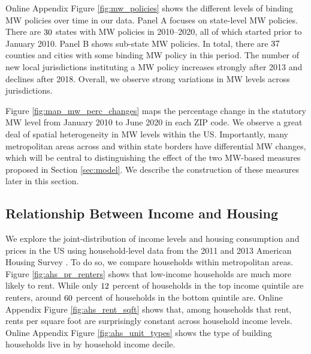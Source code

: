 Online Appendix Figure \ref{fig:mw_policies} shows the different levels of 
binding MW policies over time in our data.
Panel A focuses on state-level MW policies.
There are $\textnormal{30}$ states with MW policies in 2010--2020, all of 
which started prior to January 2010.
Panel B shows sub-state MW policies.
In total, there are $\textnormal{37}$ counties and cities with some binding MW
policy in this period.
The number of new local jurisdictions instituting a MW policy increases strongly 
after 2013 and declines after 2018.
Overall, we observe strong variations in MW levels across jurisdictions.

Figure \ref{fig:map_mw_perc_changes} maps the percentage change in 
the statutory MW level from January 2010 to June 2020 in each ZIP code.
We observe a great deal of spatial heterogeneity in MW levels within the US.
Importantly, many metropolitan areas across and within state borders have 
differential MW changes, which will be central to distinguishing the effect 
of the two MW-based measures proposed in Section \ref{sec:model}.
We describe the construction of these measures later in this section.

\subsection{Relationship Between Income and Housing}
\label{sec:data_income_housing}

We explore the joint-distribution of income levels and housing consumption and
prices in the US using household-level data from the 2011 and 2013 
American Housing Survey \parencite{ahs2020}.
To do so, we compare households within metropolitan areas.
Figure \ref{fig:ahs_pr_renters} shows that low-income households are much
more likely to rent.
While only $\textnormal{12}$ percent of households in the top income quintile 
are renters, around $\textnormal{60}$ percent of households in the bottom 
quintile are.
Online Appendix Figure \ref{fig:ahs_rent_sqft} shows that, among households 
that rent, rents per square foot are surprisingly constant across household 
income levels.
Online Appendix Figure \ref{fig:ahs_unit_types} shows the type of building 
households live in by household income decile.


